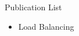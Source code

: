 \documentclass[11pt]{beamer}
\begin{document}
\begin{frame}{Publication List}
	\begin{itemize}
		
		\item Load Balancing
	\end{itemize}
\end{frame}

%	
%
%
\end{document}

